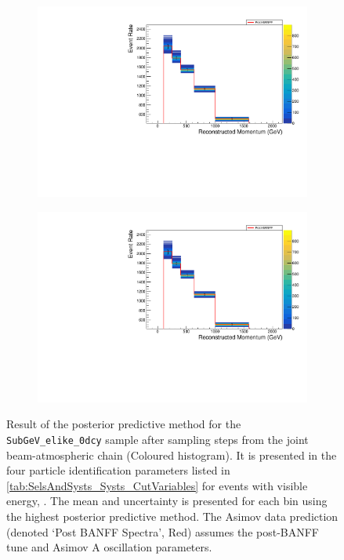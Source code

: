 \begin{figure}[h]
\begin{subfigure}[t]{0.49\textwidth}
    \includegraphics[width=\textwidth, trim={0mm 0mm 0mm 0mm}, clip,page=9]{Figures/OA/Overlay_ShiftSmear.pdf}
  \end{subfigure}%
  \begin{subfigure}[t]{0.49\textwidth}
    \includegraphics[width=\textwidth, trim={0mm 0mm 0mm 0mm}, clip,page=12]{Figures/OA/Overlay_ShiftSmear.pdf}
  \end{subfigure}
  \caption{Result of the posterior predictive method for the \texttt{SubGeV\_elike\_0dcy} sample after sampling  steps from the joint beam-atmospheric chain (Coloured histogram). It is presented in the four particle identification parameters listed in \autoref{tab:SelsAndSysts_Systs_CutVariables} for events with visible energy, . The mean and uncertainty is presented for each bin using the highest posterior predictive method. The Asimov data prediction (denoted `Post BANFF Spectra', Red) assumes the post-BANFF tune and Asimov A oscillation parameters.}
  \label{fig:OscillationAnalysis_ShiftSmearPosteriorPred}
\end{figure}

